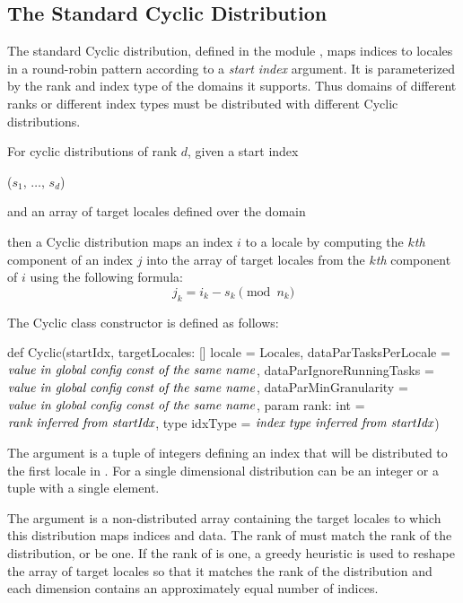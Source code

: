 \subsection{The Standard Cyclic Distribution}
\label{Cyclic_Dist}
The standard Cyclic distribution, defined in the
module , maps indices to locales in a round-robin
pattern according to a \emph{start index} argument.  It is
parameterized by the rank and index type of the domains it supports.
Thus domains of different ranks or different index types must be
distributed with different Cyclic distributions.

For cyclic distributions of rank $d$, given a start index
\begin{chapel}
($s_1$, $\ldots$, $s_d$)
\end{chapel}
and an array of target locales defined over the domain
\begin{chapel}
[$0$..$n_1$-1, $\ldots$, $0$..$n_d$-1]
\end{chapel}
then a Cyclic distribution maps an index $i$ to a locale by computing
the $k$\emph{th} component of an index $j$ into the array of target
locales from the $k$\emph{th} component of $i$ using the following
formula:
\[j_k = i_k - s_k \pmod{n_k}\]

The Cyclic class constructor is defined as follows:
\begin{chapel}
def Cyclic(startIdx,
           targetLocales: [] locale = Locales,
           dataParTasksPerLocale = $\mbox{{\it value in global config const of the same name}}$,
           dataParIgnoreRunningTasks = $\mbox{{\it value in global config const of the same name}}$,
           dataParMinGranularity = $\mbox{{\it value in global config const of the same name}}$,
           param rank: int = $\mbox{{\it rank inferred from startIdx}}$,
           type idxType = $\mbox{{\it index type inferred from startIdx}}$)
\end{chapel}

The argument  is a tuple of integers defining an index that
will be distributed to the first locale in . For a single
dimensional distribution  can be an integer or a tuple with a
single element.

The argument  is a non-distributed array
containing the target locales to which this distribution maps indices
and data.  The rank of  must match the rank of the
distribution, or be one.  If the rank of
 is one, a greedy heuristic is used to reshape the
array of target locales so that it matches the rank of the
distribution and each dimension contains an approximately equal number
of indices.

